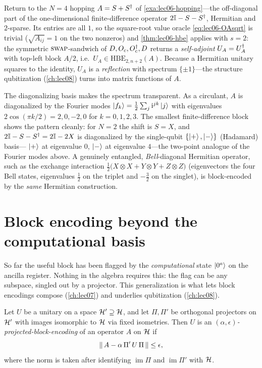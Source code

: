 \begin{example}
\label{exa:lec06-hbe-fd}
Return to the $N=4$ hopping $A=S+S^{\dagger}$ of \cref{exa:lec06-hopping}---the off-diagonal
part of the one-dimensional finite-difference operator $2\mathbb{I}-S-S^{\dagger}$, Hermitian and
$2$-sparse. Its entries are all $1$, so the square-root value oracle
\eqref{eq:lec06-OAsqrt} is trivial ($\sqrt{A_{ij}}=1$ on the two nonzeros) and
\cref{thm:lec06-hbe} applies with $s=2$: the symmetric $\textsc{swap}$-sandwich of
$D,O_c,O_c^{\dagger},D$ returns a \emph{self-adjoint} $U_A=U_A^{\dagger}$ with top-left block
$A/2$, i.e.\ $U_A\in\mathrm{HBE}_{2,n+2}(A)$. Because a Hermitian unitary squares to
the identity, $U_A$ is a \emph{reflection} with spectrum $\{\pm1\}$---the structure
qubitization (\cref{ch:lec08}) turns into matrix functions of $A$.

The diagonalizing basis makes the spectrum transparent. As a circulant, $A$ is
diagonalized by the Fourier modes $\ket{f_k}=\tfrac12\sum_j\mathrm{i}^{jk}\ket{j}$ with
eigenvalues $2\cos(\pi k/2)=2,0,-2,0$ for $k=0,1,2,3$. The smallest finite-difference
block shows the pattern cleanly: for $N=2$ the shift is $S=X$, and $2\mathbb{I}-S-S^{\dagger}
=2\mathbb{I}-2X$ is diagonalized by the single-qubit $\{\ket+,\ket-\}$ (Hadamard) basis---%
$\ket+$ at eigenvalue $0$, $\ket-$ at eigenvalue $4$---the two-point analogue of the
Fourier modes above. A genuinely entangled, \emph{Bell}-diagonal Hermitian operator,
such as the exchange interaction
$\tfrac12\bigl(X\!\otimes\!X+Y\!\otimes\!Y+Z\!\otimes\!Z\bigr)$ (eigenvectors the four
Bell states, eigenvalues $\tfrac12$ on the triplet and $-\tfrac32$ on the singlet), is
block-encoded by the \emph{same} Hermitian construction.
\end{example}

\section{Block encoding beyond the computational basis}
\label{sec:lec06-5}

So far the useful block has been flagged by the \emph{computational} state
$\ket{0^a}$ on the ancilla register. Nothing in the algebra requires this: the flag
can be any subspace, singled out by a projector. This generalization is what lets
block encodings compose (\cref{ch:lec07}) and underlies qubitization
(\cref{ch:lec08}).

\begin{definition}
\label{def:lec06-proj}
Let $U$ be a unitary on a space $\mathcal{H}'\supseteq\mathcal{H}$, and let $\Pi,\Pi'$ be
orthogonal projectors on $\mathcal{H}'$ with images isomorphic to $\mathcal{H}$ via fixed
isometries. Then $U$ is an \emph{$(\alpha,\epsilon)$-projected-block-encoding} of an
operator $A$ on $\mathcal{H}$ if
\begin{equation}
  \left\lVert \,A-\alpha\,\Pi'\,U\,\Pi\, \right\rVert\le\epsilon,
  \label{eq:lec06-projdef}
\end{equation}
where the norm is taken after identifying $\operatorname{im}\Pi$ and
$\operatorname{im}\Pi'$ with $\mathcal{H}$.
\end{definition}

